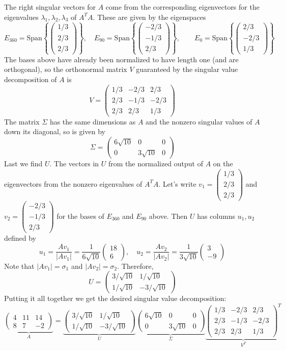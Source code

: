 \documentclass[12pt]{article}
\numberwithin{equation}{subsection}
\numberwithin{figure}{subsection}
\theoremstyle{note}
\newcommand\Span[1]{\mathrm{Span}\left\{#1\right\}}
\newcommand\m[1]{\begin{pmatrix}#1\end{pmatrix}}
\begin{document}
The right singular vectors for $A$ come from the corresponding eigenvectors for the eigenvalues $\lambda_1,\lambda_2,\lambda_3$ of $A^TA$. These are given by the eigenspaces \[ E_{360}=\Span{ \m{1/3 \\ 2/3\\2/3}}, \quad E_{90}=\Span{\m{-2/3 \\ -1/3 \\ 2/3}}, \qquad E_0=\Span{ \m{2/3 \\ -2/3 \\ 1/3}}\]
The bases above have already been normalized to have length one (and are orthogonal), so the orthonormal matrix $V$ guaranteed by the singular value decomposition of $A$ is \[V=\m{1/3 & -2/3 & 2/3 \\ 2/3 & -1/3 & -2/3 \\ 2/3 & 2/3 & 1/3}\] 
The matrix $\Sigma$ has the same dimensions as $A$ and the nonzero singular values of $A$ down its diagonal, so is given by \[ \Sigma=\m{ 6\sqrt{10} & 0 & 0 \\ 0 & 3\sqrt{10} & 0}\] 
Last we find $U$. The vectors in $U$ from the normalized output of $A$ on the eigenvectors from the nonzero eigenvalues of $A^TA$. Let's write $v_1=\m{1/3 \\ 2/3\\2/3}$ and $v_2=\m{-2/3 \\ -1/3 \\ 2/3}$ for the bases of $E_{360}$ and $E_{90}$ above. Then $U$ has columns $u_1,u_2$ defined by \[ u_1=\dfrac{Av_1}{|Av_1|}=\dfrac{1}{6\sqrt{10}} \m{18 \\ 6}, \quad u_2=\dfrac{Av_2}{|Av_2|}=\dfrac{1}{3\sqrt{10}}\m{3 \\ -9}\]
Note that $|Av_1|=\sigma_1$ and $|Av_2|=\sigma_2$. Therefore, \[ U=\m{ 3/\sqrt{10} & 1/\sqrt{10} \\ 1/\sqrt{10} & -3/\sqrt{10}}\] 
Putting it all together we get the desired singular value decomposition:\[
\underbrace{\m{ 4 & 11 & 14 \\ 8 & 7 & -2}}_A=\underbrace{\m{ 3/\sqrt{10} & 1/\sqrt{10} \\ 1/\sqrt{10} & -3/\sqrt{10}}}_U \underbrace{\m{ 6\sqrt{10} & 0 & 0 \\ 0 & 3\sqrt{10} & 0}}_{\Sigma} \underbrace{\m{1/3 & -2/3 & 2/3 \\ 2/3 & -1/3 & -2/3 \\ 2/3 & 2/3 & 1/3}^T}_{V^T}
\]
\end{document}
